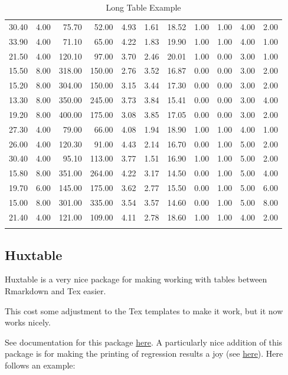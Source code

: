 \documentclass[11pt,preprint, authoryear]{elsarticle}
\numberwithin{equation}{section}
\numberwithin{figure}{section}
\numberwithin{table}{section}
\begin{document}
\begin{longtable}{rrrrrrrrrrr}
  30.40 & 4.00 & 75.70 & 52.00 & 4.93 & 1.61 & 18.52 & 1.00 & 1.00 & 4.00 & 2.00 \\ 
  33.90 & 4.00 & 71.10 & 65.00 & 4.22 & 1.83 & 19.90 & 1.00 & 1.00 & 4.00 & 1.00 \\ 
  21.50 & 4.00 & 120.10 & 97.00 & 3.70 & 2.46 & 20.01 & 1.00 & 0.00 & 3.00 & 1.00 \\ 
  15.50 & 8.00 & 318.00 & 150.00 & 2.76 & 3.52 & 16.87 & 0.00 & 0.00 & 3.00 & 2.00 \\ 
  15.20 & 8.00 & 304.00 & 150.00 & 3.15 & 3.44 & 17.30 & 0.00 & 0.00 & 3.00 & 2.00 \\ 
  13.30 & 8.00 & 350.00 & 245.00 & 3.73 & 3.84 & 15.41 & 0.00 & 0.00 & 3.00 & 4.00 \\ 
  19.20 & 8.00 & 400.00 & 175.00 & 3.08 & 3.85 & 17.05 & 0.00 & 0.00 & 3.00 & 2.00 \\ 
  27.30 & 4.00 & 79.00 & 66.00 & 4.08 & 1.94 & 18.90 & 1.00 & 1.00 & 4.00 & 1.00 \\ 
  26.00 & 4.00 & 120.30 & 91.00 & 4.43 & 2.14 & 16.70 & 0.00 & 1.00 & 5.00 & 2.00 \\ 
  30.40 & 4.00 & 95.10 & 113.00 & 3.77 & 1.51 & 16.90 & 1.00 & 1.00 & 5.00 & 2.00 \\ 
  15.80 & 8.00 & 351.00 & 264.00 & 4.22 & 3.17 & 14.50 & 0.00 & 1.00 & 5.00 & 4.00 \\ 
  19.70 & 6.00 & 145.00 & 175.00 & 3.62 & 2.77 & 15.50 & 0.00 & 1.00 & 5.00 & 6.00 \\ 
  15.00 & 8.00 & 301.00 & 335.00 & 3.54 & 3.57 & 14.60 & 0.00 & 1.00 & 5.00 & 8.00 \\ 
  21.40 & 4.00 & 121.00 & 109.00 & 4.11 & 2.78 & 18.60 & 1.00 & 1.00 & 4.00 & 2.00 \\ 
   \bottomrule
\caption{Long Table Example} 
\end{longtable}

\endgroup

\hfill

\subsection{Huxtable}\label{huxtable}

Huxtable is a very nice package for making working with tables between
Rmarkdown and Tex easier.

This cost some adjustment to the Tex templates to make it work, but it
now works nicely.

See documentation for this package
\href{https://hughjonesd.github.io/huxtable/huxtable.html}{here}. A
particularly nice addition of this package is for making the printing of
regression results a joy (see
\href{https://hughjonesd.github.io/huxtable/huxtable.html\#creating-a-regression-table}{here}).
Here follows an example:
\end{document}
